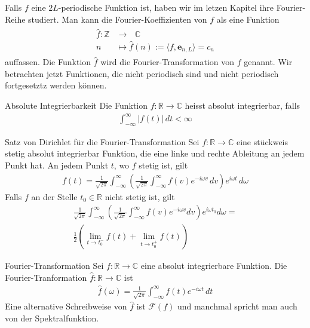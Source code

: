 \documentclass[a4paper,10pt]{article}
\begin{document}
Falls \(f\) eine \(2L\)-periodische Funktion ist, haben wir im letzen Kapitel ihre Fourier-Reihe studiert. Man kann die Fourier-Koeffizienten von \(f\) als eine Funktion \begin{align*} \begin{aligned} \hat f\colon\mathbb{Z}&\longrightarrow~~~\mathbb{C}\\ n&\mapsto \hat f( n ):=\langle f,\mathbf{e}_{n,L}\rangle=c_n \end{aligned} \end{align*} auffassen. Die Funktion \(\hat f\) wird die Fourier-Transformation von \(f\) genannt. Wir betrachten jetzt Funktionen, die nicht periodisch sind und nicht periodisch fortgesetztz werden können.

\begin{subbox}{Absolute Integrierbarkeit}
  Die Funktion \(f\colon\mathbb{R}\to\mathbb{C}\) heisst absolut integrierbar, falls \begin{align*} \int_{-\infty}^\infty |f(t)|\,dt<\infty \end{align*}
\end{subbox}

\begin{subbox}{Satz von Dirichlet für die Fourier-Transformation}
  Sei \(f\colon\mathbb{R}\to\mathbb{C}\) eine stückweis stetig absolut integrierbar Funktion, die eine linke und rechte Ableitung an jedem Punkt hat. An jedem Punkt \(t\), wo \(f\) stetig ist, gilt \begin{align*} f(t)=\frac{1}{\sqrt{2\pi}}\int_{-\infty }^\infty \left(\frac{1}{\sqrt{2\pi}}\int_{-\infty}^\infty f(v )e^{- i \omega v }\,dv \right)e^{ i \omega t}\,d\omega \end{align*} Falls \(f\) an der Stelle \(t_0\in\mathbb{R}\) nicht stetig ist, gilt 
  \begin{align*} 
    \frac{1}{\sqrt{2\pi}}\int_{-\infty }^\infty \left(\frac{1}{\sqrt{2\pi}}\int_{-\infty}^\infty f(v )e^{- i \omega v } dv \right)e^{ i \omega t_0} d\omega =\\
    \frac12\left(\lim_{t\to t_0^-}f(t)+\lim_{t\to t_0^+}f(t)\right) \end{align*}
\end{subbox}

\begin{mainbox}{Fourier-Transformation}
  Sei \(f\colon\mathbb{R}\to\mathbb{C}\) eine absolut integrierbare Funktion. Die Fourier-Tranformation \(\hat f\colon\mathbb{R}\to\mathbb{C}\) ist \begin{align*} \hat f(\omega)=\frac{1}{\sqrt{2\pi}}\int_{-\infty}^\infty f(t)e^{- i\omega t}\,dt \end{align*} Eine alternative Schreibweise von \(\hat f\) ist \(\mathcal F(f)\) und manchmal spricht man auch von der Spektralfunktion.
\end{mainbox}
\end{document}
